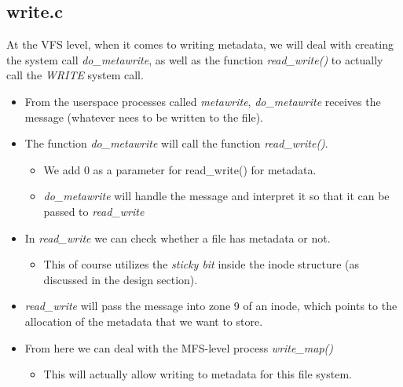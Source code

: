 \documentclass[paper=a4, fontsize=11pt]{scrartcl}
\numberwithin{equation}{section} %
\numberwithin{figure}{section} %
\numberwithin{table}{section} %
\begin{document}
	\subsection{write.c}
	At the VFS level, when it comes to writing metadata, we will deal with creating the system call {\it do\_metawrite}, as well as the function {\it read\_write()} to actually call the {\it WRITE} system call.
		\begin{itemize}
	
			\item From the userspace processes called {\it metawrite}, {\it do\_metawrite} receives the message (whatever nees to be written to the file).
			\item The function {\it do\_metawrite} will call the function {\it read\_write()}.
				\begin{itemize}
				\item We add 0 as a parameter for read\_write() for metadata.
					\item {\it do\_metawrite} will handle the message and interpret it so that it can be passed to {\it read\_write}
				\end{itemize}
			\item In {\it read\_write} we can check whether a file has metadata or not.
				\begin{itemize}
					\item This of course utilizes the {\it sticky bit} inside the inode structure (as discussed in the design section).
				\end{itemize}
			\item {\it read\_write} will pass the message into zone 9 of an inode, which points to the allocation of the metadata that we want to store.
			\item From here we can deal with the MFS-level process {\it write\_map()}
				\begin{itemize}
					\item This will actually allow writing to metadata for this file system.
				\end{itemize}
		\end{itemize}
\end{document}
